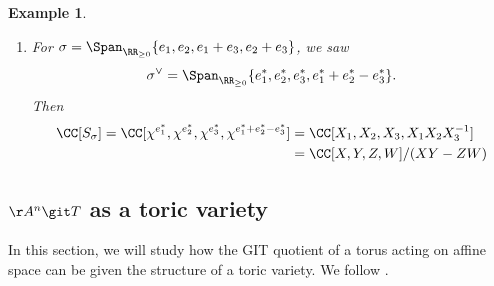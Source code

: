 \documentclass[12pt]{amsart}
\theoremstyle{plain}
\newtheorem{example}[theorem]{Example}
\begin{document}
\begin{example}
\begin{enumerate}
\begin{figure}[H]
\end{figure}
\noindent
Observe that while $2 e_1^* + e_2^*$ and $e_2^*$ generate $\sigma^\vee$ as a cone, they do not generate $S_\sigma$ as a semigroup.
For example, $e_1^* + e_2^* \in S_\sigma$ but $e_1^* + e_2^* \notin \ZZ_{\ge 0} \cdot (2 e_1^* + e_2^*) + \ZZ_{\ge 0} \cdot e_2^*.$
However, $e_2^*, e_1^* + e_2^*, 2 e_1^* + e_2^*$ do generate $S_\sigma$.
Then
\begin{align*}
	\qquad \CC[S_\sigma] = \CC[\chi^{e_2^*}, \chi^{e_1^* + e_2^*}, \chi^{2 e_1^* + e_2^*}] &= \CC[X_2, X_1 X_2, X_1^2 X_2] = \CC[U, V, W] / (U W - V^2)
\end{align*}

\item
For $\sigma = \Span_{\RR_{\ge 0}}\{ e_1, e_2, e_1+e_3, e_2 + e_3\}$, we saw
$$\sigma^\vee = \Span_{\RR_{\ge 0}} \{e_1^*, e_2^*, e_3^*, e_1^* +e_2^* - e_3^*\}.$$
Then 
\begin{align*}
	\CC[S_\sigma] = \CC[\chi^{e_1^*}, \chi^{e_2^*}, \chi^{e_3^*}, \chi^{e_1^* +e_2^* - e_3^*}] &= \CC[X_1, X_2, X_3, X_1 X_2 X_3^{-1}] \\
	&= \CC[X, Y, Z, W]/(XY - ZW)
\end{align*}

\end{enumerate}
\end{example}

\subsection{$\AA^n \git T$ as a toric variety}
In this section, we will study how the GIT quotient of a torus acting on affine space can be given the structure of a toric variety.
We follow \cite[\S 12]{Dolgachev03}.
\end{document}
